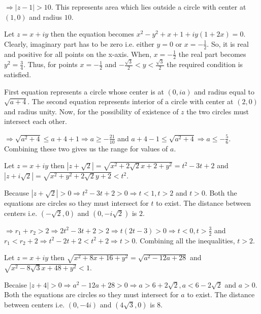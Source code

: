   $\Rightarrow |z - 1| > 10$. This represents area which lies outside a circle with center at $(1, 0)$ and
  radius $10$.
\item Let $z = x + iy$ then the equation becomes $x^2 - y^2 + x + 1 + iy(1 + 2x) = 0$. Clearly, imaginary
  part has to be zero i.e. either $y = 0$ or $x = -\frac{1}{2}$. So, it is real and positive for all points
  on the x-axis. When, $x = -\frac{1}{2}$ the real part becomes $y^2 = \frac{3}{4}$. Thus, for points $x =
  -\frac{1}{2}$ and $-\frac{\sqrt{3}}{2}<y<\frac{\sqrt{3}}{2}$ the required condition is satisfied.
\item First equation represents a circle whose center is at $(0, ia)$ and radius equal to $\sqrt{a +
  4}$. The second equation represents interior of a circle with center at $(2, 0)$ and radius unity. Now,
  for the possibility of existence of $z$ the two circles must intersect each other.

  $\Rightarrow \sqrt{a^2 + 4} \leq a + 4 + 1 \Rightarrow a \geq -\frac{21}{10}$ and $a + 4 - 1\leq \sqrt{a^2
    + 4} \Rightarrow a\leq -\frac{5}{6}$. Combining these two gives us the range for values of $a$.
\item Let $z = x + iy$ then $|z + \sqrt{2}| = \sqrt{x^2 + 2\sqrt{2}x + 2 + y^2} = t^2 - 3t + 2$ and $|z +
  i\sqrt{2}| = \sqrt{x^2 + y^2 + 2\sqrt{2}y + 2} < t^2$.

  Because $|z + \sqrt{2}| > 0 \Rightarrow t^2 - 3t + 2 > 0 \Rightarrow t < 1, t > 2$ and $t > 0$. Both the
  equations are circles so they must intersect for $t$ to exist. The distance between centers
  i.e. $(-\sqrt{2}, 0)$ and $(0, -i\sqrt{2})$ is $2$.

  $\Rightarrow r_1 + r_2 > 2 \Rightarrow 2t^2 - 3t + 2 > 2 \Rightarrow t(2t - 3) > 0 \Rightarrow t < 0, t >
  \frac{3}{2}$ and $r_1 < r_2 + 2 \Rightarrow t^2 - 2t + 2 < t^2 + 2 \Rightarrow t  > 0$. Combining all the
  inequalities, $t > 2$.
\item Let $z = x + iy$ then $\sqrt{x^2 + 8x + 16 + y^2} = \sqrt{a^2 - 12a + 28}$ and $\sqrt{x^2 - 8\sqrt{3}x
  + 48 + y^2} < 1$.

  Becaise $|z + 4| > 0 \Rightarrow a^2 - 12a + 28 > 0 \Rightarrow a > 6 + 2\sqrt{2}, a < 6 - 2\sqrt{2}$ and
  $a > 0$. Both the equations are  circles so they must intersect for $a$ to exist. The distance between
  centers i.e. $(0, -4i)$ and $(4\sqrt{3}, 0)$ is $8$.


